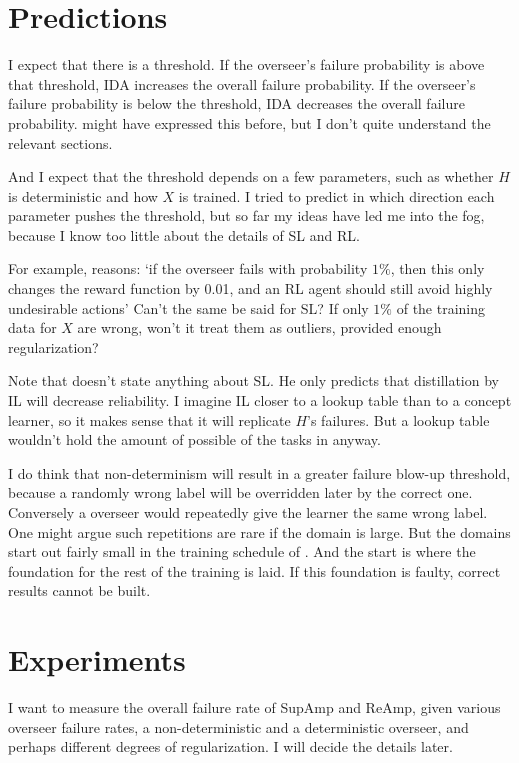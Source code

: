 \documentclass{farlamp}
\begin{document}
\section{Predictions}
\label{sec:prediction}

I expect that there is a threshold. If the overseer's failure probability is
above that threshold, IDA increases the overall failure probability. If the
overseer's failure probability is below the threshold, IDA decreases the overall
failure probability. \textcite{ChriRelAmp} might have expressed this before, but
I don't quite understand the relevant sections.

And I expect that the threshold depends on a few parameters, such as whether $H$
is deterministic and how $X$ is trained. I tried to predict in which direction
each parameter pushes the threshold, but so far my ideas have led me into the
fog, because I know too little about the details of SL and RL.

For example, \textcite{ChriRelAmp} reasons: ‘if the overseer fails with
probability $1 \%$, then this only changes the reward function by 0.01, and an
RL agent should still avoid highly undesirable actions’ Can't the same be said
for SL? If only $1 \%$ of the training data for $X$ are wrong, won't it treat
them as outliers, provided enough regularization?

Note that \textcite{ChriRelAmp} doesn't state anything about SL. He only
predicts that distillation by IL will decrease reliability. I imagine IL closer
to a lookup table than to a concept learner, so it makes sense that it will
replicate $H$'s failures. But a lookup table wouldn't hold the amount of
possible of the tasks in \textcite{CSASupAmp} anyway.

I do think that non-determinism will result in a greater failure blow-up
threshold, because a randomly wrong label will be overridden later by the
correct one. Conversely a overseer would repeatedly give the learner the same
wrong label. One might argue such repetitions are rare if the domain is large.
But the domains start out fairly small in the training schedule of
\textcite{CSASupAmp}. And the start is where the foundation for the rest of the
training is laid. If this foundation is faulty, correct results cannot be built.


\section{Experiments}

I want to measure the overall failure rate of SupAmp and ReAmp, given various
overseer failure rates, a non-deterministic and a deterministic overseer, and
perhaps different degrees of regularization. I will decide the details later.
\end{document}
